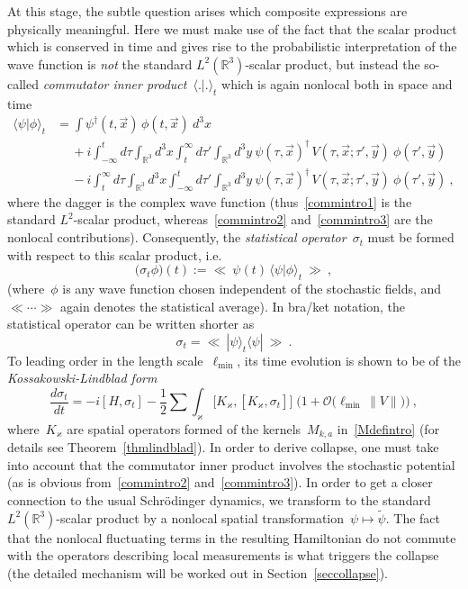 \documentclass[reqno,11pt]{amsart}
\numberwithin{equation}{section}
\newcommand{\la}{\langle}
\newcommand{\ra}{\rangle}
\newcommand{\bbra}{\mathopen{\ll}}
\newcommand{\kket}{\mathclose{\gg}}
\newcommand{\R}{\mathbb{R}}
\newcommand{\1}{\mathds{1}}
\renewcommand{\O}{{\mathscr{O}}}
\newcommand{\sint}{\sum  \!\!\!\!\!\!\! \int }
\begin{document}
At this stage, the subtle question arises which composite expressions are physically meaningful.
Here we must make use of the fact that the scalar product which is conserved in time and gives rise
to the probabilistic interpretation of the wave function is {\em{not}} the standard $L^2(\R^3)$-scalar product,
but instead the so-called {\em{commutator inner product}}~$\la .|. \ra_t$ which is again nonlocal both
in space and time
\begin{align}
\la \psi | \phi \ra_t &= \int \psi^\dagger(t,\vec{x}) \,\phi(t,\vec{x}) \: d^3x \label{commintro1} \\
&\quad\:+i \int_{-\infty}^t d\tau \int_{\R^3} d^3x \int_t^\infty d\tau' \int_{\R^3} d^3y \:
\psi(\tau, \vec{x})^\dagger\, V(\tau,\vec{x}; \tau', \vec{y}) \:\phi(\tau', \vec{y}) \label{commintro2} \\
&\quad\:-i \int_t^\infty d\tau \int_{\R^3} d^3x \int_{-\infty}^t d\tau' \int_{\R^3} d^3y \:
\psi(\tau, \vec{x})^\dagger\, V(\tau,\vec{x}; \tau', \vec{y}) \:\phi(\tau', \vec{y}) \:, \label{commintro3}
\end{align}
where the dagger is the complex wave function (thus~\eqref{commintro1} is the standard $L^2$-scalar product,
whereas~\eqref{commintro2} and~\eqref{commintro3} are the nonlocal contributions).
Consequently, the {\em{statistical operator}}~$\sigma_t$ must be formed with respect to this scalar product, i.e.\
\[ \big( \sigma_t \phi \big)(t) := \bbra \:\psi(t) \,\la \psi | \phi \ra_t \:\kket \:, \]
(where~$\phi$ is any wave function chosen independent of the stochastic fields, and $\bbra \cdots \kket$
again denotes the statistical average). In bra/ket notation, the statistical operator can be written shorter as
\[ \sigma_t = \bbra \: |\psi \ra_t \la \psi | \:\kket \:. \]
To leading order in the length scale~$\ell_{\min}$, its
time evolution is shown to be of the {\em{Kossa\-kow\-ski-Lindblad form}}
\[ \frac{d \sigma_t}{dt} = -i [H, \sigma_t] - \frac{1}{2} \sint_\varkappa 
\big[ K_\varkappa, [K_\varkappa, \sigma_t] \big] \; \Big( 1 + \O \big( \ell_{\min}\, \|V\| \big) \Big)\:, \]
where~$K_\varkappa$ are spatial operators formed of the kernels~$M_{k,a}$ in~\eqref{Mdefintro}
(for details see Theorem~\ref{thmlindblad}).
In order to derive collapse, one must take into account that the
commutator inner product involves the stochastic potential (as is obvious from~\eqref{commintro2} and~\eqref{commintro3}).
In order to get a closer connection to the usual Schr\"odinger dynamics, we
transform to the standard $L^2(\R^3)$-scalar product by a nonlocal spatial
transformation~$\psi \mapsto \tilde{\psi}$.
The fact that the nonlocal fluctuating terms in the resulting
Hamiltonian do not commute with the operators describing local measurements is what
triggers the collapse (the detailed mechanism will be worked out in Section~\ref{seccollapse}).
\end{document}
